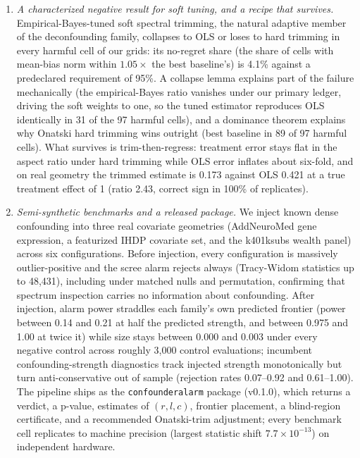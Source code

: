 \begin{enumerate}
\item \emph{A characterized negative result for soft tuning, and a recipe that survives.} Empirical-Bayes-tuned soft spectral trimming, the natural adaptive member of the deconfounding family, collapses to OLS or loses to hard trimming in every harmful cell of our grids: its no-regret share (the share of cells with mean-bias norm within $1.05\times$ the best baseline's) is 4.1\% against a predeclared requirement of 95\%. A collapse lemma explains part of the failure mechanically (the empirical-Bayes ratio vanishes under our primary ledger, driving the soft weights to one, so the tuned estimator reproduces OLS identically in 31 of the 97 harmful cells), and a dominance theorem explains why Onatski hard trimming wins outright (best baseline in 89 of 97 harmful cells). What survives is trim-then-regress: treatment error stays flat in the aspect ratio under hard trimming while OLS error inflates about six-fold, and on real geometry the trimmed estimate is 0.173 against OLS 0.421 at a true treatment effect of 1 (ratio 2.43, correct sign in 100\% of replicates).
\item \emph{Semi-synthetic benchmarks and a released package.} We inject known dense confounding into three real covariate geometries (AddNeuroMed gene expression, a featurized IHDP covariate set, and the k401ksubs wealth panel) across six configurations. Before injection, every configuration is massively outlier-positive and the scree alarm rejects always (Tracy-Widom statistics up to 48,431), including under matched nulls and permutation, confirming that spectrum inspection carries no information about confounding. After injection, alarm power straddles each family's own predicted frontier (power between 0.14 and 0.21 at half the predicted strength, and between 0.975 and 1.00 at twice it) while size stays between 0.000 and 0.003 under every negative control across roughly 3,000 control evaluations; incumbent confounding-strength diagnostics track injected strength monotonically but turn anti-conservative out of sample (rejection rates 0.07--0.92 and 0.61--1.00). The pipeline ships as the \texttt{confounderalarm} package (v0.1.0), which returns a verdict, a p-value, estimates of $(r, l, c)$, frontier placement, a blind-region certificate, and a recommended Onatski-trim adjustment; every benchmark cell replicates to machine precision (largest statistic shift $7.7 \times 10^{-13}$) on independent hardware.
\end{enumerate}

